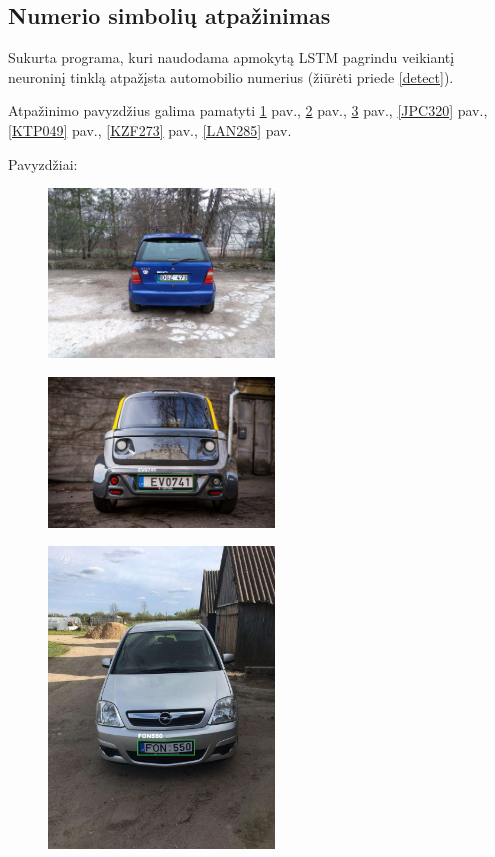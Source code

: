\documentclass{VUMIFInfBakalaurinis}
\begin{document}
\subsection{Numerio simbolių atpažinimas}
Sukurta programa, kuri naudodama apmokytą LSTM pagrindu veikiantį neuroninį tinklą atpažįsta automobilio numerius (žiūrėti priede \ref{detect}).

Atpažinimo pavyzdžius galima pamatyti \ref{DGZ473} pav., \ref{EV0741} pav., \ref{FON550} pav., \ref{JPC320} pav., \ref{KTP049} pav., \ref{KZF273} pav., \ref{LAN285} pav.

Pavyzdžiai:
\newline
\begin{subfigure}{\linewidth}
  \centering
  \includegraphics[width=6cm]{cars/dgz473.jpg}
  \label{DGZ473}
\end{subfigure}
\begin{subfigure}{\linewidth}
  \centering
  \includegraphics[width=6cm]{cars/ev0741.jpg}
  \label{EV0741}
\end{subfigure}
\begin{subfigure}{\linewidth}
  \centering
  \includegraphics[width=6cm]{cars/fon550.jpg}
  \label{FON550}
\end{subfigure}
\end{document}
